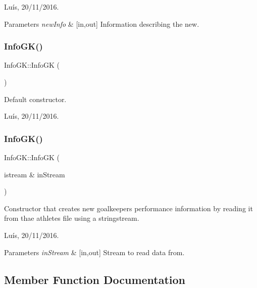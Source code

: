 Luís, 20/11/2016. 


\begin{DoxyParams}{Parameters}
{\em new\+Info} & \mbox{[}in,out\mbox{]} Information describing the new. \\
\hline
\end{DoxyParams}
\hypertarget{class_info_g_k_a433a9a5bf75d9624be89100bc2e2e118}{}\label{class_info_g_k_a433a9a5bf75d9624be89100bc2e2e118} 
\subsubsection{\texorpdfstring{Info\+G\+K()}{InfoGK()}\hspace{0.1cm}{\footnotesize\ttfamily [3/4]}}
{\footnotesize\ttfamily Info\+G\+K\+::\+Info\+GK (\begin{DoxyParamCaption}{ }\end{DoxyParamCaption})}



Default constructor. 

Luís, 20/11/2016. \hypertarget{class_info_g_k_aeace217be1619844c5637ba5cd3717ef}{}\label{class_info_g_k_aeace217be1619844c5637ba5cd3717ef} 
\subsubsection{\texorpdfstring{Info\+G\+K()}{InfoGK()}\hspace{0.1cm}{\footnotesize\ttfamily [4/4]}}
{\footnotesize\ttfamily Info\+G\+K\+::\+Info\+GK (\begin{DoxyParamCaption}\item[{istream \&}]{in\+Stream }\end{DoxyParamCaption})}



Constructor that creates new goalkeeper\textquotesingle{}s performance information by reading it from thae athletes file using a stringstream. 

Luís, 20/11/2016. 


\begin{DoxyParams}{Parameters}
{\em in\+Stream} & \mbox{[}in,out\mbox{]} Stream to read data from. \\
\hline
\end{DoxyParams}


\subsection{Member Function Documentation}
\hypertarget{class_info_g_k_aa29eeb0025487da9106007246478a0b5}{}\label{class_info_g_k_aa29eeb0025487da9106007246478a0b5} 
